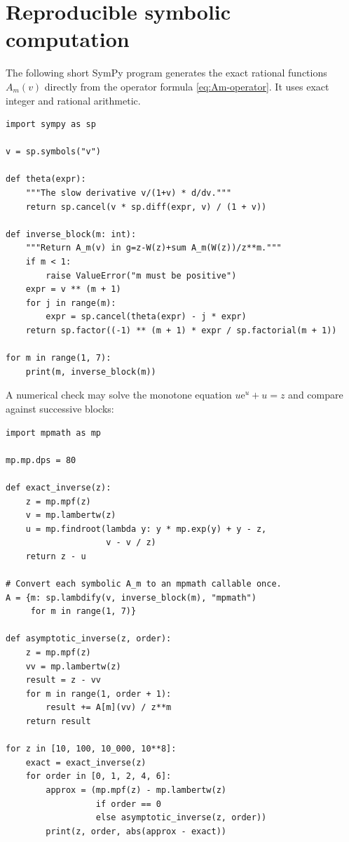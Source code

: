 \documentclass[11pt,oneside]{article}
\theoremstyle{plain}
\theoremstyle{definition}
\theoremstyle{remark}
\newcommand{\e}{\mathrm{e}}
\begin{document}
\section{Reproducible symbolic computation}
\label{app:code}

The following short SymPy program generates the exact rational functions
\(A_m(v)\) directly from the operator formula \eqref{eq:Am-operator}.  It uses
exact integer and rational arithmetic.

\begin{lstlisting}
import sympy as sp

v = sp.symbols("v")

def theta(expr):
    """The slow derivative v/(1+v) * d/dv."""
    return sp.cancel(v * sp.diff(expr, v) / (1 + v))

def inverse_block(m: int):
    """Return A_m(v) in g=z-W(z)+sum A_m(W(z))/z**m."""
    if m < 1:
        raise ValueError("m must be positive")
    expr = v ** (m + 1)
    for j in range(m):
        expr = sp.cancel(theta(expr) - j * expr)
    return sp.factor((-1) ** (m + 1) * expr / sp.factorial(m + 1))

for m in range(1, 7):
    print(m, inverse_block(m))
\end{lstlisting}

A numerical check may solve the monotone equation \(u\e^u+u=z\) and compare
against successive blocks:

\begin{lstlisting}
import mpmath as mp

mp.mp.dps = 80

def exact_inverse(z):
    z = mp.mpf(z)
    v = mp.lambertw(z)
    u = mp.findroot(lambda y: y * mp.exp(y) + y - z,
                    v - v / z)
    return z - u

# Convert each symbolic A_m to an mpmath callable once.
A = {m: sp.lambdify(v, inverse_block(m), "mpmath")
     for m in range(1, 7)}

def asymptotic_inverse(z, order):
    z = mp.mpf(z)
    vv = mp.lambertw(z)
    result = z - vv
    for m in range(1, order + 1):
        result += A[m](vv) / z**m
    return result

for z in [10, 100, 10_000, 10**8]:
    exact = exact_inverse(z)
    for order in [0, 1, 2, 4, 6]:
        approx = (mp.mpf(z) - mp.lambertw(z)
                  if order == 0
                  else asymptotic_inverse(z, order))
        print(z, order, abs(approx - exact))
\end{lstlisting}
\end{document}
